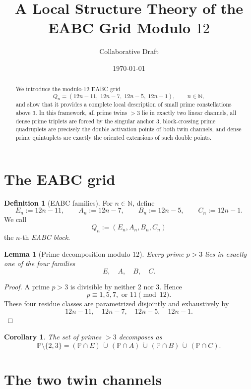 \documentclass[11pt,a4paper]{article}
\title{A Local Structure Theory of the EABC Grid Modulo \(12\)}
\author{Collaborative Draft}
\date{\today}
\newtheorem{lemma}[theorem]{Lemma}
\newtheorem{corollary}[theorem]{Corollary}
\theoremstyle{definition}
\newtheorem{definition}[theorem]{Definition}
\theoremstyle{remark}
\newcommand{\N}{\mathbb{N}}
\newcommand{\PP}{\mathbb{P}}
\begin{document}
	\maketitle
	
	\begin{abstract}
		We introduce the modulo-\(12\) EABC grid
		\[
		Q_n=(12n-11,\;12n-7,\;12n-5,\;12n-1),
		\qquad n\in\N,
		\]
		and show that it provides a complete local description of small prime constellations above \(3\).
		In this framework, all prime twins \(>3\) lie in exactly two linear channels, all dense prime triplets
		are forced by the singular anchor \(3\), block-crossing prime quadruplets are precisely the double
		activation points of both twin channels, and dense prime quintuplets are exactly the oriented
		extensions of such double points.
	\end{abstract}
	
	\section{The EABC grid}
	
	\begin{definition}[EABC families]
		For \(n\in\N\), define
		\[
		E_n:=12n-11,\qquad
		A_n:=12n-7,\qquad
		B_n:=12n-5,\qquad
		C_n:=12n-1.
		\]
		We call
		\[
		Q_n:=(E_n,A_n,B_n,C_n)
		\]
		the \(n\)-th \emph{EABC block}.
	\end{definition}
	
	\begin{lemma}[Prime decomposition modulo \(12\)]
		Every prime \(p>3\) lies in exactly one of the four families
		\[
		E,\quad A,\quad B,\quad C.
		\]
	\end{lemma}
	
	\begin{proof}
		A prime \(p>3\) is divisible by neither \(2\) nor \(3\). Hence
		\[
		p\equiv 1,5,7,\text{ or }11 \pmod{12}.
		\]
		These four residue classes are parametrized disjointly and exhaustively by
		\[
		12n-11,\quad 12n-7,\quad 12n-5,\quad 12n-1.
		\]
	\end{proof}
	
	\begin{corollary}
		The set of primes \(>3\) decomposes as
		\[
		\PP\setminus\{2,3\}
		=
		(\PP\cap E)\,\dot\cup\,(\PP\cap A)\,\dot\cup\,(\PP\cap B)\,\dot\cup\,(\PP\cap C).
		\]
	\end{corollary}
	
	\section{The two twin channels}
	
\end{document}
